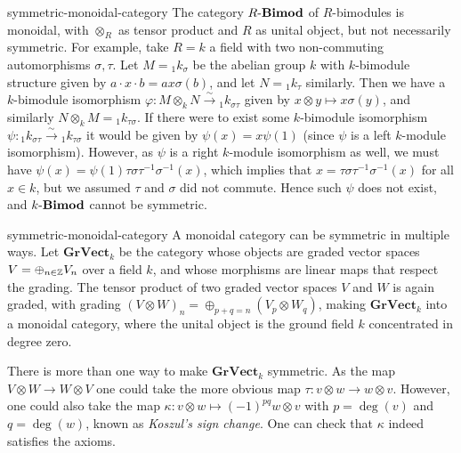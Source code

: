 \begin{example}{symmetric-monoidal-category}
    The category $R\textup{-}\textbf{Bimod}$ of $R$-bimodules is monoidal, with $\otimes_R$ as tensor product and $R$ as unital object, but not necessarily symmetric. For example, take $R = k$ a field with two non-commuting automorphisms $\sigma, \tau$. Let $M = {}_1 k_\sigma$ be the abelian group $k$ with $k$-bimodule structure given by $a \cdot x \cdot b = ax \sigma(b)$, and let $N = {}_1 k_\tau$ similarly. Then we have a $k$-bimodule isomorphism $\varphi \colon M \otimes_k N \xrightarrow{\sim} {}_1 k_{\sigma \tau}$ given by $x \otimes y \mapsto x \sigma(y)$, and similarly $N \otimes_k M = {}_1 k_{\tau \sigma}$. If there were to exist some $k$-bimodule isomorphism $\psi \colon {}_1 k_{\sigma \tau} \xrightarrow{\sim} {}_1 k_{\tau \sigma}$ it would be given by $\psi(x) = x \psi(1)$ (since $\psi$ is a left $k$-module isomorphism). However, as $\psi$ is a right $k$-module isomorphism as well, we must have $\psi(x) = \psi(1) \tau \sigma \tau^{-1} \sigma^{-1} (x)$, which implies that $x = \tau \sigma \tau^{-1} \sigma^{-1} (x)$ for all $x \in k$, but we assumed $\tau$ and $\sigma$ did not commute. Hence such $\psi$ does not exist, and $k\textup{-}\textbf{Bimod}$ cannot be symmetric.
\end{example}

\begin{example}{symmetric-monoidal-category}
    A monoidal category can be symmetric in multiple ways. Let $\textbf{GrVect}_k$ be the category whose objects are graded vector spaces $V = \oplus_{n \in \mathbb{Z}} V_n$ over a field $k$, and whose morphisms are linear maps that respect the grading. The tensor product of two graded vector spaces $V$ and $W$ is again graded, with grading $(V \otimes W)_n = \oplus_{p + q = n} (V_p \otimes W_q)$, making $\textbf{GrVect}_k$ into a monoidal category, where the unital object is the ground field $k$ concentrated in degree zero.
        
    There is more than one way to make $\textbf{GrVect}_k$ symmetric. As the map $V \otimes W \to W \otimes V$ one could take the more obvious map $\tau \colon v \otimes w \to w \otimes v$. However, one could also take the map $\kappa \colon v \otimes w \mapsto (-1)^{pq} w \otimes v$ with $p = \deg(v)$ and $q = \deg(w)$, known as \textit{Koszul's sign change}. One can check that $\kappa$ indeed satisfies the axioms.
\end{example}

